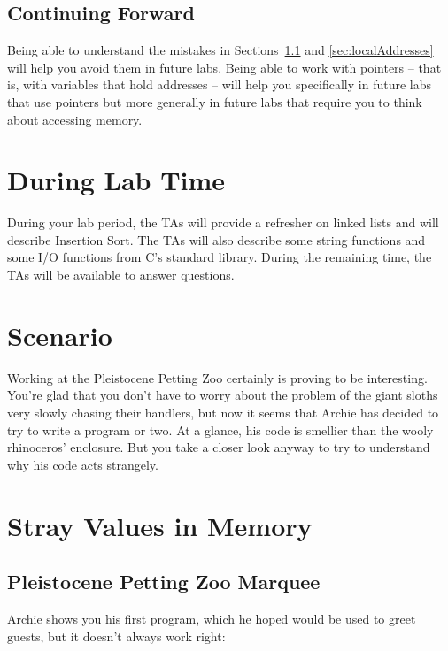 \subsection*{Continuing Forward}

Being able to understand the mistakes in
Sections~\ref{sec:uninitializedVariables} and \ref{sec:localAddresses} will
help you avoid them in future labs. Being able to work with pointers -- that
is, with variables that hold addresses -- will help you specifically in future
labs that use pointers but more generally in future labs that require you to
think about accessing memory.

\section*{During Lab Time}

During your lab period, the TAs will provide a refresher on linked lists and
will describe Insertion Sort. The TAs will also describe some string functions
and some I/O functions from C's standard library. During the remaining time,
the TAs will be available to answer questions.

\section*{Scenario}

Working at the Pleistocene Petting Zoo certainly is proving to be interesting.
You're glad that you don't have to worry about the problem of the giant sloths
very slowly chasing their handlers, but now it seems that Archie has decided to
try to write a program or two. At a glance, his code is smellier than the wooly
rhinoceros' enclosure. But you take a closer look anyway to try to understand
why his code acts strangely.

\section{Stray Values in Memory}

\subsection{Pleistocene Petting Zoo Marquee}\label{sec:uninitializedVariables}

Archie shows you his first program, which he hoped would be used to greet
guests, but it doesn't always work right:

